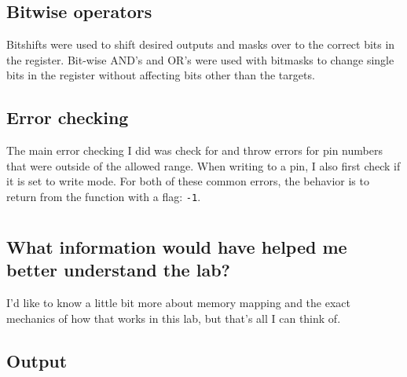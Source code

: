 \documentclass{article}
\begin{document}
\subsection{Bitwise operators}
Bitshifts were used to shift desired outputs and masks over to the correct bits in the register. Bit-wise AND's and OR's were used with bitmasks to change single bits in the register without affecting bits other than the targets.

\subsection{Error checking}
The main error checking I did was check for and throw errors for pin numbers that were outside of the allowed range. When writing to a pin, I also first check if it is set to write mode. For both of these common errors, the behavior is to return from the function with a flag: \texttt{-1}.

\section{}
\subsection{What information would have helped me better understand the lab?}
I'd like to know a little bit more about memory mapping and the exact mechanics of how that works in this lab, but that's all I can think of.

\subsection{Output}


\end{document}
